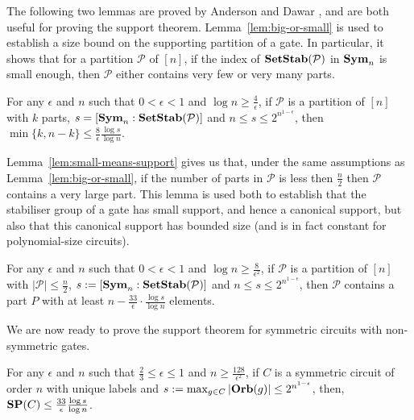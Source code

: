 \documentclass[../main/thesis.tex]{subfiles}
\begin{document}
The following two lemmas are proved by Anderson and Dawar \cite{AndersonD17},
and are both useful for proving the support theorem.
Lemma~\ref{lem:big-or-small} is used to establish a size bound on the supporting
partition of a gate. In particular, it shows that for a partition $\mathcal{P}$
of $[n]$, if the index of $\text{\textbf{SetStab}} (\mathcal{P})$ in $\text{\textbf{Sym}}_n$ is small enough,
then $\mathcal{P}$ either contains very few or very many parts.

\begin{lem}
  \label{lem:big-or-small}
  For any $\epsilon$ and $n$ such that $0 < \epsilon < 1$ and $\log n \geq
  \frac{4}{\epsilon}$, if $\mathcal{P}$ is a partition of $[n]$ with $k$ parts,
  $s = [\text{\textbf{Sym}}_n : \text{\textbf{SetStab}} (\mathcal{P})]$ and $n \leq s \leq
  2^{n^{1-\epsilon}}$, then $\min \{k, n-k\} \leq \frac{8}{\epsilon} \frac{\log
    s}{\log n}$.
\end{lem}

Lemma~\ref{lem:small-means-support} gives us that, under the same assumptions as
Lemma~\ref{lem:big-or-small}, if the number of parts in $\mathcal{P}$ is less
then $\frac{n}{2}$ then $\mathcal{P}$ contains a very large part. This lemma is
used both to establish that the stabiliser group of a gate has small support,
and hence a canonical support, but also that this canonical support has bounded
size (and is in fact constant for polynomial-size circuits).

\begin{lem}
  \label{lem:small-means-support}
  For any $\epsilon$ and $n$ such that $0 < \epsilon < 1$ and $\log n \geq
  \frac{8}{\epsilon^2}$, if $\mathcal{P}$ is a partition of $[n]$ with $\vert
  \mathcal{P} \vert \leq \frac{n}{2}$, $s:= [\text{\textbf{Sym}}_n : \text{\textbf{SetStab}} (\mathcal{P})]$
  and $n \leq s \leq 2^{n^{1-\epsilon}}$, then $\mathcal{P}$ contains a part $P$
  with at least $n - \frac{33}{\epsilon} \cdot \frac{\log s} {\log n}$ elements.
\end{lem}

We are now ready to prove the support theorem for symmetric circuits with
non-symmetric gates.

\begin{thm}
  \label{thm:support-thm}
  For any $\epsilon$ and $n$ such that $\frac{2}{3} \leq \epsilon \leq 1$ and $n
  \geq \frac{128}{\epsilon^2}$, if $C$ is a symmetric circuit of order $n$ with
  unique labels and $s := \max_{g \in C} \vert \text{\textbf{Orb}} (g)\vert \leq
  2^{n^{1-\epsilon}}$, then, $\text{\textbf{SP}}(C) \leq \frac{33}{\epsilon}\frac{\log s}{\log
    n}$.
\end{thm}
\end{document}
